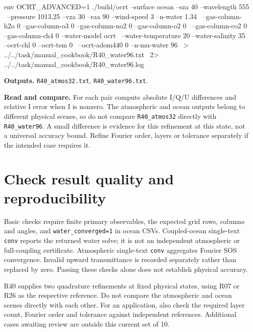 \noindent\begin{minipage}{\linewidth}
\begin{ManualCode}

env OCRT_ADVANCED=1 ./build/ocrt --surface ocean --sza 40 --wavelength 555 \
  --pressure 1013.25 --vza 30 --raa 90 --wind-speed 3 --n-water 1.34 \
  --gas-column-h2o 0 --gas-column-o3 0 --gas-column-no2 0 --gas-column-o2 0 \
  --gas-column-co2 0 --gas-column-ch4 0 --water-model ocrt \
  --water-temperature 20 --water-salinity 35 --ocrt-chl 0 --ocrt-tsm 0 \
  --ocrt-adom440 0 --n-mu-water 96 \
  > ../../task/manual_cookbook/R40_water96.txt \
  2> ../../task/manual_cookbook/R40_water96.log

\end{ManualCode}
\end{minipage}\par

\textbf{Outputs. }\texttt{R40\_\allowbreak{}atmos32.txt}, \texttt{R40\_\allowbreak{}water96.txt}.

\textbf{Read and compare. }For each pair compute absolute I/Q/U differences and relative I error when I is nonzero. The atmospheric and ocean outputs belong to different physical scenes, so do not compare \texttt{R40\_\allowbreak{}atmos32} directly with \texttt{R40\_\allowbreak{}water96}. A small difference is evidence for this refinement at this state, not a universal accuracy bound. Refine Fourier order, layers or tolerance separately if the intended case requires it.

\clearpage

\section{Check result quality and reproducibility}

\label{sec:auto:09_cookbook:7}

\label{sec:cookbook_quality}

Basic checks require finite primary observables, the expected grid rows, columns and angles, and \texttt{water\_\allowbreak{}converged=1} in ocean CSVs. Coupled-ocean single-text \texttt{conv} reports the returned water solve; it is not an independent atmospheric or full-coupling certificate. Atmospheric single-text \texttt{conv} aggregates Fourier SOS convergence. Invalid upward transmittance is recorded separately rather than replaced by zero. Passing these checks alone does not establish physical accuracy.

R40 supplies two quadrature refinements at fixed physical states, using R07 or R26 as the respective reference. Do not compare the atmospheric and ocean scenes directly with each other. For an application, also check the required layer count, Fourier order and tolerance against independent references. Additional cases awaiting review are outside this current set of 10.

